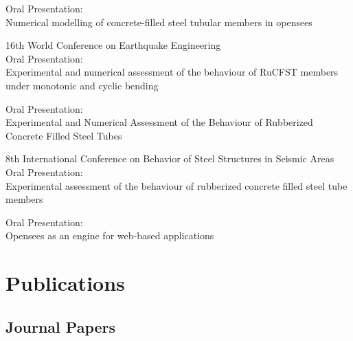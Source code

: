 \documentclass{../Template/my_cv}
\begin{document}
 {
  Oral Presentation: \\

  Numerical modelling of concrete-filled steel tubular members in opensees
}

 {
  16th World Conference on Earthquake Engineering \\

  Oral Presentation: \\

  Experimental and numerical assessment of the behaviour of RuCFST members under monotonic and cyclic bending
}

 {
  Oral Presentation: \\

  Experimental and Numerical Assessment of the Behaviour of Rubberized Concrete Filled Steel Tubes
}


 {
  8th International Conference on Behavior of Steel Structures in Seismic Areas \\
  
  Oral Presentation: \\

  Experimental assessment of the behaviour of rubberized concrete filled steel tube members
}

 {
  Oral Presentation: \\

  Opensees as an engine for web-based applications
}

\section{Publications}

\subsection{Journal Papers}

\end{document}
